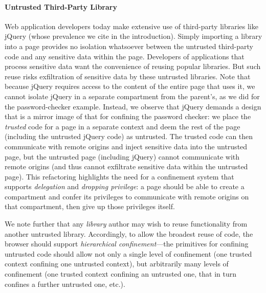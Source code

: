 \paragraph{Untrusted Third-Party Library}
Web application developers today make extensive use of third-party
libraries like jQuery (whose prevalence we cite in the
introduction). Simply importing a library into a page provides no
isolation whatsoever between the untrusted third-party code and any
sensitive data within the page. Developers of applications that
process sensitive data want the convenience of reusing popular
libraries. But such reuse risks exfiltration of sensitive data by
these untrusted libraries. Note that because jQuery requires access to
the content of the entire page that uses it, we cannot isolate jQuery
in a separate compartment from the parent's, as we did for the
password-checker example. Instead, we observe that jQuery demands a
design that is a mirror image of that for confining the password
checker: we place the {\em trusted} code for a page in a separate
context and deem the rest of the page (including the untrusted jQuery
code) as untrusted. The trusted code can then communicate with remote
origins and inject sensitive data into the untrusted page, but the
untrusted page (including jQuery) cannot communicate with remote
origins (and thus cannot exfiltrate sensitive data within the
untrusted page).
This refactoring highlights the need for a confinement system that
supports {\em delegation} and {\em dropping privilege}: a page should
be able to create a compartment and confer its privileges to
communicate with remote origins on that compartment, then give up
those privileges itself.

We note further that any {\em library} author
may wish to reuse functionality from another untrusted
library. Accordingly, to allow the broadest reuse of code, the browser
should support {\em hierarchical confinement}---the primitives for
confining untrusted code should allow not only a single level of
confinement (one trusted context confining one untrusted context), but
arbitrarily many levels of confinement (one trusted context confining
an untrusted one, that in turn confines a further untrusted one,
etc.).


